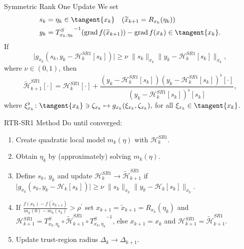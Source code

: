 \documentclass{beamer}
\begin{document}
\begin{frame}{Symmetric Rank One Update}
    We set
    \begin{align*}
        & s_k = \eta_k \in \tangent{x_k} \quad (\widetilde{x}_{k+1} = R_{x_k}(\eta_k))\\
        & y_k = {T^{S}_{x_k, \eta_k}}^{-1} ( \operatorname{grad}f(\widetilde{x}_{k+1}) ) - \operatorname{grad}f(x_k) \in \tangent{x_k}.
    \end{align*}
    If 
    \begin{equation*}
        \lvert g_{x_k}(s_k, y_k - \mathcal{H}^{SR1}_k[s_k]) \rvert \geq \nu \; \lVert s_k \rVert_{x_k} \lVert y_k - \mathcal{H}^{SR1}_k[s_k] \rVert_{x_k},
    \end{equation*}
    where $\nu \in (0,1)$, then
    \begin{equation*}
        \widetilde{\mathcal{H}}^{SR1}_{k+1} [\cdot] = \mathcal{H}^{SR1}_k [\cdot] + \frac{(y_k - \mathcal{H}^{SR1}_k [s_k]) (y_k - \mathcal{H}^{SR1}_k [s_k])^{\flat} [\cdot] }{(y_k - \mathcal{H}^{SR1}_k [s_k])^{\flat} [s_k]},
    \end{equation*}
    where $\xi^{\flat}_{x_k} \colon \tangent{x_k} \ni \zeta_{x_k} \mapsto g_{x_k}(\xi_{x_k}, \zeta_{x_k}),$ for all $\xi_{x_k} \in \tangent{x_k}$.
\end{frame}

\begin{frame}{RTR-SR1 Method}
    Do until converged:
    \begin{enumerate}
        \item Create quadratic local model $m_k(\eta)$ with $\mathcal{H}^{SR1}_k$. \\[0.2\baselineskip]
        \item Obtain $\eta_k$ by (approximately) solving $m_k(\eta)$. \\[0.2\baselineskip]
        \item Define $s_k, \ y_k$ and update $\mathcal{H}^{SR1}_k \rightarrow \widetilde{\mathcal{H}}^{SR1}_{k+1}$ if $\lvert g_{x_k}(s_k, y_k - \mathcal{H}_k[s_k]) \rvert \geq \nu \; \lVert s_k \rVert_{x_k} \lVert y_k - \mathcal{H}_k[s_k] \rVert_{x_k}$. \\[0.2\baselineskip]
        \item If $\frac{f(x_k) - f(\widetilde{x}_{k+1})}{m_k(0) - m_k(s_k)} > \rho^{\prime}$ set $x_{k+1} = \widetilde{x}_{k+1} = R_{x_k}(\eta_k)$ and $\mathcal{H}^{SR1}_{k+1} = T^{S}_{x_k, \eta_k} \circ \widetilde{\mathcal{H}}^{SR1}_{k+1} \circ  {T^{S}_{x_k, \eta_k}}^{-1}$, else $x_{k+1} = x_k$ and $\mathcal{H}^{SR1}_{k+1} = \widetilde{\mathcal{H}}^{SR1}_{k+1}$.\\[0.2\baselineskip]
        \item Update trust-region radius $\Delta_k \rightarrow \Delta_{k+1}$.
    \end{enumerate}
\end{frame}
\end{document}
